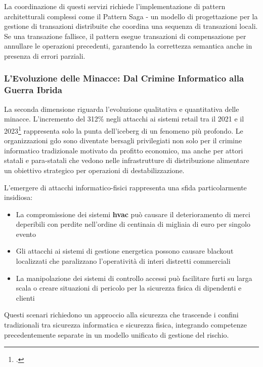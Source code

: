 La coordinazione di questi servizi richiede l'implementazione di pattern architetturali complessi come il Pattern Saga - un modello di progettazione per la gestione di transazioni distribuite che coordina una sequenza di transazioni locali. Se una transazione fallisce, il pattern esegue transazioni di compensazione per annullare le operazioni precedenti, garantendo la correttezza semantica anche in presenza di errori parziali.

\subsubsection{\texorpdfstring{L'Evoluzione delle Minacce: Dal Crimine Informatico alla Guerra Ibrida}{1.1.2.2 - L'Evoluzione delle Minacce: Dal Crimine Informatico alla Guerra Ibrida}}
\label{subsubsec:evoluzione_minacce}

La seconda dimensione riguarda l'evoluzione qualitativa e quantitativa delle minacce. L'incremento del 312\% negli attacchi ai sistemi retail tra il 2021 e il 2023\footcite{enisa2024retail} rappresenta solo la punta dell'iceberg di un fenomeno più profondo. Le organizzazioni \gls{gdo} sono diventate bersagli privilegiati non solo per il crimine informatico tradizionale motivato da profitto economico, ma anche per attori statali e para-statali che vedono nelle infrastrutture di distribuzione alimentare un obiettivo strategico per operazioni di destabilizzazione.

L'emergere di attacchi informatico-fisici rappresenta una sfida particolarmente insidiosa:
\begin{itemize}
\item La compromissione dei sistemi \textbf{\gls{hvac}} può causare il deterioramento di merci deperibili con perdite nell'ordine di centinaia di migliaia di euro per singolo evento
\item Gli attacchi ai sistemi di gestione energetica possono causare blackout localizzati che paralizzano l'operatività di interi distretti commerciali
\item La manipolazione dei sistemi di controllo accessi può facilitare furti su larga scala o creare situazioni di pericolo per la sicurezza fisica di dipendenti e clienti
\end{itemize}

Questi scenari richiedono un approccio alla sicurezza che trascende i confini tradizionali tra sicurezza informatica e sicurezza fisica, integrando competenze precedentemente separate in un modello unificato di gestione del rischio.

